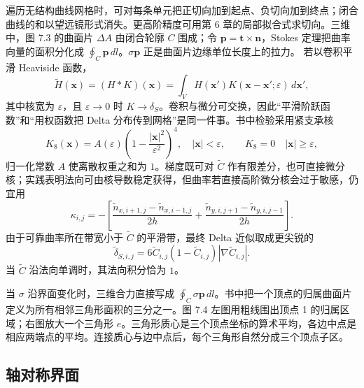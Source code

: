 \documentclass[11pt,a4paper,openany,fontset=none]{ctexbook}
\begin{document}
遍历无结构曲线网格时，可对每条单元把正切向加到起点、负切向加到终点；闭合曲线的和以望远镜形式消失。更高阶精度可用第 6 章的局部拟合式求切向。三维中，图 7.3 的曲面片 $\Delta A$ 由闭合轮廓 $C$ 围成；令 $\boldsymbol p=\boldsymbol t\times\boldsymbol n$，Stokes 定理把曲率向量的面积分化成 $\oint_C\boldsymbol p\,dl$。$\sigma\boldsymbol p$ 正是曲面片边缘单位长度上的拉力。
若以卷积平滑 Heaviside 函数，
\begin{equation}
 \widetilde H(\boldsymbol x)
 =(H*K)(\boldsymbol x)
 =\int_VH(\boldsymbol x')K(\boldsymbol x-\boldsymbol x';\varepsilon)\,d\boldsymbol x',
 \tag{7.35}
\end{equation}
其中核宽为 $\varepsilon$，且 $\varepsilon\to0$ 时 $K\to\delta_S$。卷积与微分可交换，因此“平滑阶跃函数”和“用权函数把 Delta 分布传到网格”是同一件事。书中检验采用紧支承核
\begin{equation}
 K_8(\boldsymbol x)=A(\varepsilon)
 \left(1-\frac{|\boldsymbol x|^2}{\varepsilon^2}\right)^4,
 \quad |\boldsymbol x|<\varepsilon,
 \qquad K_8=0\quad |\boldsymbol x|\ge\varepsilon,
 \tag{7.36}
\end{equation}
归一化常数 $A$ 使离散权重之和为 $1$。梯度既可对 $\widetilde C$ 作有限差分，也可直接微分核；实践表明法向可由核导数稳定获得，但曲率若直接高阶微分核会过于敏感，仍宜用
\begin{equation}
 \kappa_{i,j}=-\left[
 \frac{\widetilde n_{x,i+1,j}-\widetilde n_{x,i-1,j}}{2h}
 +\frac{\widetilde n_{y,i,j+1}-\widetilde n_{y,i,j-1}}{2h}
 \right].
 \tag{7.41}
\end{equation}
由于可靠曲率所在带宽小于 $\widetilde C$ 的平滑带，最终 Delta 近似取成更尖锐的
\begin{equation}
 \widetilde\delta_{S,i,j}=6\widetilde C_{i,j}(1-\widetilde C_{i,j})
 |\nabla\widetilde C_{i,j}|.
 \tag{7.42}
\end{equation}
当 $\widetilde C$ 沿法向单调时，其法向积分恰为 $1$。

当 $\sigma$ 沿界面变化时，三维合力直接写成 $\oint_C\sigma\boldsymbol p\,dl$。书中把一个顶点的归属曲面片定义为所有相邻三角形面积的三分之一。图 7.4 左图用粗线围出顶点 1 的归属区域；右图放大一个三角形 $e$。三角形质心是三个顶点坐标的算术平均，各边中点是相应两端点的平均。连接质心与边中点后，每个三角形自然分成三个顶点子区。
\subsection{轴对称界面}
\end{document}

